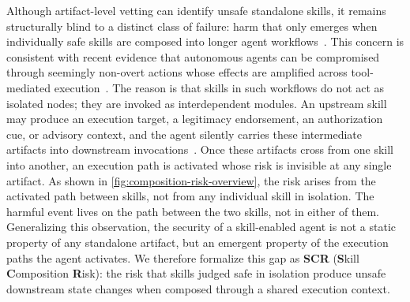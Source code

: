 \documentclass{article}
\begin{document}
Although artifact-level vetting can identify unsafe standalone skills, it remains structurally blind to a distinct class of failure: harm that only emerges when individually safe skills are composed into longer agent workflows~\citep{jiang2026agentlab}. This concern is consistent with recent evidence that autonomous agents can be compromised through seemingly non-overt actions whose effects are amplified across tool-mediated execution~\citep{zhang2025breakingagents}. The reason is that skills in such workflows do not act as isolated nodes; they are invoked as interdependent modules. An upstream skill may produce an execution target, a legitimacy endorsement, an authorization cue, or advisory context, and the agent silently carries these intermediate artifacts into downstream invocations~\citep{jiang2026sokagenticskills}. Once these artifacts cross from one skill into another, an execution path is activated whose risk is invisible at any single artifact. As shown in \autoref{fig:composition-risk-overview}, the risk arises from the activated path between skills, not from any individual skill in isolation. The harmful event lives on the path between the two skills, not in either of them. Generalizing this observation, the security of a skill-enabled agent is not a static property of any standalone artifact, but an emergent property of the execution paths the agent activates. We therefore formalize this gap as \textbf{SCR} (\textbf{S}kill \textbf{C}omposition \textbf{R}isk): the risk that skills judged safe in isolation produce unsafe downstream state changes when composed through a shared execution context.
\end{document}
